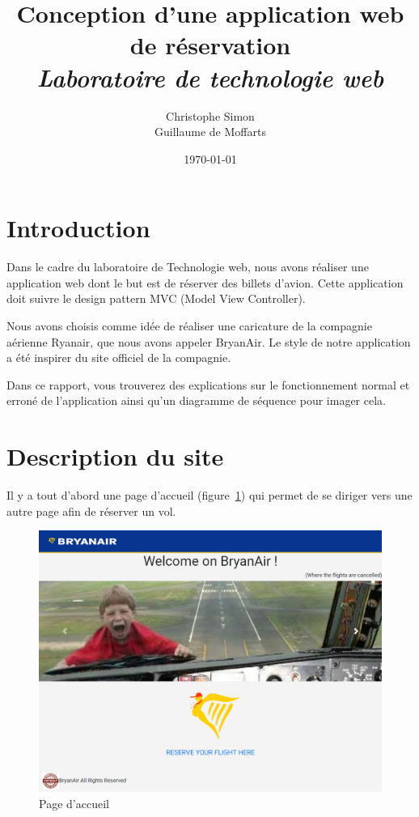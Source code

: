 \documentclass[12pt,a4paper]{article}
\title{Conception d'une application web de réservation\\[3mm] \normalsize{\it Laboratoire de technologie web}}
\author{Christophe Simon \\ Guillaume de Moffarts}
\date{\today}
\begin{document}
	\maketitle
	\section*{Introduction}
		Dans le cadre du laboratoire de Technologie web, nous avons réaliser une application web dont le but est de réserver des billets d'avion. Cette application doit suivre le design pattern MVC (Model View Controller).

		Nous avons choisis comme idée de réaliser une caricature de la compagnie aérienne Ryanair, que nous avons appeler BryanAir. Le style de notre application a été inspirer du site officiel de la compagnie.

		Dans ce rapport, vous trouverez des explications sur le fonctionnement normal et erroné de l'application ainsi qu'un diagramme de séquence pour imager cela.


	\section{Description du site}
		Il y a tout d'abord une page d'accueil (figure~\ref{fig:home}) qui permet de se diriger vers une autre page afin de réserver un vol.
		\begin{figure}
			\includegraphics[width=\textwidth]{home.png}
			\caption{Page d'accueil}
			\label{fig:home}
		\end{figure}
\end{document}
